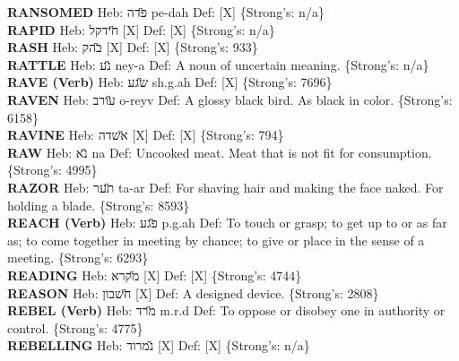 {\textbf{RANSOMED} Heb: {\large\H פדה} pe-dah Def: {[}X{]} \{Strong's: n/a\}\hfill{}\\

\textbf{RAPID} Heb: {\large\H חידקל} {[}X{]} Def: {[}X{]} \{Strong's: n/a\}\hfill{}\\

\textbf{RASH} Heb: {\large\H בהק} {[}X{]} Def: {[}X{]} \{Strong's: 933\}\hfill{}\\

\textbf{RATTLE} Heb: {\large\H נע} ney-a Def: A noun of uncertain meaning. \{Strong's: n/a\}\hfill{}\\

\textbf{RAVE (Verb)} Heb: {\large\H שגע} sh.g.ah Def: {[}X{]} \{Strong's: 7696\}\hfill{}\\

\textbf{RAVEN} Heb: {\large\H עורב} o-reyv Def: A glossy black bird. As black in color. \{Strong's: 6158\}\hfill{}\\

\textbf{RAVINE} Heb: {\large\H אשדה} {[}X{]} Def: {[}X{]} \{Strong's: 794\}\hfill{}\\

\textbf{RAW} Heb: {\large\H נא} na Def: Uncooked meat. Meat that is not fit for consumption. \{Strong's: 4995\}\hfill{}\\

\textbf{RAZOR} Heb: {\large\H תער} ta-ar Def: For shaving hair and making the face naked. For holding a blade. \{Strong's: 8593\}\hfill{}\\

\textbf{REACH (Verb)} Heb: {\large\H פגע} p.g.ah Def: To touch or grasp; to get up to or as far as; to come together in meeting by chance; to give or place in the sense of a meeting. \{Strong's: 6293\}\hfill{}\\

\textbf{READING} Heb: {\large\H מקרא} {[}X{]} Def: {[}X{]} \{Strong's: 4744\}\hfill{}\\

\textbf{REASON} Heb: {\large\H חשבון} {[}X{]} Def: A designed device. \{Strong's: 2808\}\hfill{}\\

\textbf{REBEL (Verb)} Heb: {\large\H מרד} m.r.d Def: To oppose or disobey one in authority or control. \{Strong's: 4775\}\hfill{}\\

\textbf{REBELLING} Heb: {\large\H נמרוד} {[}X{]} Def: {[}X{]} \{Strong's: n/a\}\hfill{}\\

}
